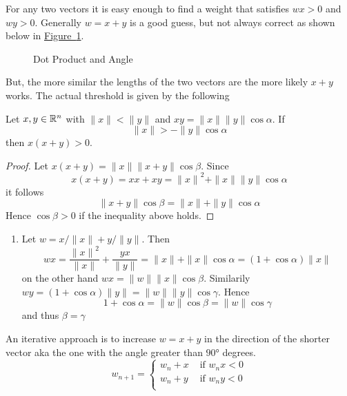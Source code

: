 For any two vectors it is easy enough to find a weight that satisfies \( wx > 0 \) and \( wy > 0 \).
Generally \( w = x + y \) is a good guess, but not always correct as shown below in
\hyperref[fig:vectorangle]{Figure~\ref*{fig:vectorangle}}.

\bigskip
\begin{figure}[H]
    \centering
    \plotvectorangle{}
    \caption{Dot Product and Angle}\label{fig:vectorangle}
\end{figure}
\bigskip

But, the more similar the lengths of the two vectors are the more likely \( x + y \) works.
The actual threshold is given by the following
\bigskip

\begin{lemma}
    Let \( x, y \in \mathbb{R}^n \) with \( \|x\| < \|y\| \) and \( xy = \|x\| \|y\| \cos\alpha \). If
    \[
        \|x\| > -\|y\|\cos\alpha
    \]
    then \( x(x + y) > 0 \).
\end{lemma}

\begin{proof}
    Let \( x(x + y) = \|x\| \|x + y\| \cos\beta \). Since
    \[
        x(x + y) = xx + xy = {\|x\|}^2 + \|x\| \|y\| \cos\alpha
    \]
    it follows
    \[
        {\|x + y\|}\cos\beta = \|x\| + \|y\|\cos\alpha
    \]
    Hence \( \cos\beta > 0 \) if the inequality above holds.
\end{proof}
\bigskip


\begin{example}
    \hfill
    \begin{enumerate}
        \item Let \( w = x / \|x\| + y/ \|y\| \). Then
              \[
                  wx = \frac{{\|x\|}^2}{\|x\|} + \frac{yx}{\|y\|}
                        = \|x\| + \|x\|\cos\alpha = (1 + \cos\alpha)\|x\|
              \]
              on the other hand \( wx = \|w\| \|x\| \cos\beta \). Similarily 
              \( wy = (1 + \cos\alpha)\|y\| = \|w\| \|y\| \cos\gamma \). Hence
              \[
                1 + \cos\alpha = \|w\|\cos\beta = \|w\|\cos\gamma
              \]
              and thus \( \beta = \gamma \)
    \end{enumerate}
\end{example}
\bigskip


An iterative approach is to increase \( w = x + y \) in the direction of the shorter vector aka the one
with the angle greater than \( \ang{90} \) degrees.
\[
    w_{n + 1} = \left \{
    \begin{array}{ll}
        w_n + x & \text{ if } w_n x < 0 \\
        w_n + y & \text{ if } w_n y < 0 \\
    \end{array}
    \right.
\]
\bigskip

